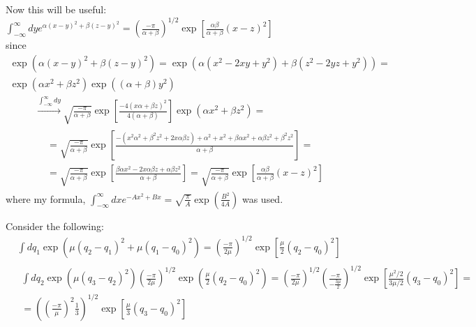 \documentclass[twoside]{amsart}
\begin{document}
\begin{itemize}
Now this will be useful: $\boxed{ \int_{-\infty}^{\infty} dy e^{\alpha (x-y)^2 + \beta (z-y)^2 } = \left( \frac{ -\pi}{ \alpha + \beta} \right)^{1/2} \exp{ \left[ \frac{ \alpha \beta}{ \alpha + \beta} (x-z)^2\right] } }$  \\
since $\begin{gathered} \exp{ (\alpha(x-y)^2 + \beta(z-y)^2) } = \exp{ ( \alpha(x^2 - 2xy +y^2) + \beta( z^2  -2yz + y^2) )} = \\ \exp{ ( \alpha x^2 + \beta z^2)} \exp{ ( ( \alpha + \beta)y^2) } \end{gathered}$
\[
\begin{gathered}
  \xrightarrow{\int_{-\infty}^{\infty} dy } \sqrt{  \frac{ -\pi}{ \alpha + \beta } } \exp{ \left[ \frac{ -4 (x\alpha + \beta z)^2}{ 4( \alpha + \beta)} \right] } \exp{ ( \alpha x^2 + \beta z^2) } = \\ 
  \begin{aligned} & = \sqrt{ \frac{ -\pi }{\alpha + \beta}} \exp{ \left[ \frac{ - (x^2 \alpha^2 + \beta^2 z^2 + 2x\alpha \beta z) + \alpha^2 + x^2 + \beta \alpha x^2 + \alpha \beta z^2 + \beta^2 z^2 }{ \alpha + \beta} \right] } = \\
      & = \sqrt{  \frac{ - \pi}{\alpha + \beta} } \exp{ \left[ \frac{ \beta \alpha x^2 - 2x\alpha \beta z + \alpha \beta z^2}{ \alpha + \beta} \right] } = \sqrt{ \frac{ - \pi}{\alpha + \beta} } \exp{ \left[ \frac{ \alpha \beta}{\alpha + \beta} (x-z)^2 \right] } \end{aligned}
\end{gathered}
\]
where my formula, $\int_{-\infty}^{\infty} dx e^{-Ax^2 + Bx} = \sqrt{ \frac{ \pi}{A} } \exp{ \left( \frac{B^2}{4A} \right)}$ was used.  

Consider the following:
\[
\begin{aligned}
  & \int dq_1 \exp{ \left( \mu (q_2 - q_1)^2 + \mu(q_1 -q_0)^2 \right) } = \left( \frac{ - \pi}{2\mu } \right)^{1/2} \exp{ \left[ \frac{\mu}{2} (q_2-q_0)^2 \right] } \\ 
  & \begin{gathered} \int dq_2 \exp{ (\mu (q_3 - q_2)^2 )} \left( \frac{-\pi}{2\mu } \right)^{1/2} \exp{ \left( \frac{ \mu}{2} (q_2-q_0)^2 \right)} = \left( \frac{-\pi}{2\mu} \right)^{1/2} \left( \frac{ -\pi }{ - \frac{ 3\mu}{2} }\right)^{1/2} \exp{ \left[ \frac{ \mu^2/2}{ 3\mu /2} (q_3-q_0)^2 \right]} = \\ 
      = \left( \left( \frac{ -\pi}{\mu} \right)^2 \frac{1}{3} \right)^{1/2} \exp{ \left[ \frac{ \mu}{3} (q_3- q_0)^2 \right] }
\end{gathered}
\end{aligned}
\]


\end{itemize}
\end{document}
